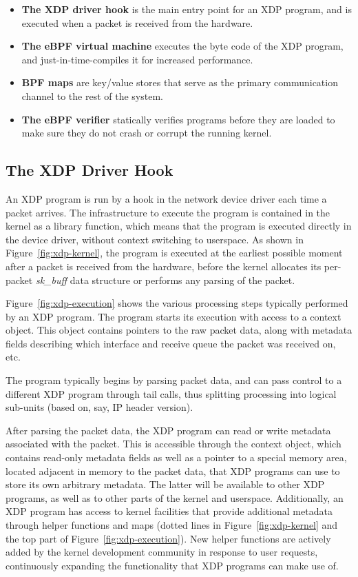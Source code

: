 \documentclass[sigconf]{acmart}
\begin{document}
\begin{itemize}
\item \textbf{The XDP driver hook} is the main entry point for an XDP program,
  and is executed when a packet is received from the hardware.

\item \textbf{The eBPF virtual machine} executes the byte code of the XDP
  program, and just-in-time-compiles it for increased performance.

\item \textbf{BPF maps} are key/value stores that serve as the primary
  communication channel to the rest of the system.

\item \textbf{The eBPF verifier} statically verifies programs before they are
  loaded to make sure they do not crash or corrupt the running kernel.
\end{itemize}


\subsection{The XDP Driver Hook}
\label{sec:prog-model}


An XDP program is run by a hook in the network device driver each time a packet
arrives. The infrastructure to execute the program is contained in the kernel as
a library function, which means that the program is executed directly in the
device driver, without context switching to userspace. As shown in
Figure~\ref{fig:xdp-kernel}, the program is executed at the earliest possible
moment after a packet is received from the hardware, before the kernel allocates
its per-packet \emph{sk\_buff} data structure or performs any parsing of the
packet.

Figure~\ref{fig:xdp-execution} shows the various processing steps typically
performed by an XDP program. The program starts its execution with access to a
context object. This object contains pointers to the raw packet data, along with
metadata fields describing which interface and receive queue the packet was
received on, etc.

The program typically begins by parsing packet data, and can pass control to a
different XDP program through tail calls, thus splitting processing into
logical sub-units (based on, say, IP header version).

After parsing the packet data, the XDP program can read or write metadata
associated with the packet. This is accessible through the context object, which
contains read-only metadata fields as well as a pointer to a special memory
area, located adjacent in memory to the packet data, that XDP programs can use
to store its own arbitrary metadata. The latter will be available to other XDP
programs, as well as to other parts of the kernel and userspace. Additionally,
an XDP program has access to kernel facilities that provide additional metadata
through helper functions and maps (dotted lines in Figure~\ref{fig:xdp-kernel}
and the top part of Figure~\ref{fig:xdp-execution}). New helper functions are
actively added by the kernel development community in response to user requests,
continuously expanding the functionality that XDP programs can make use of.
\end{document}
